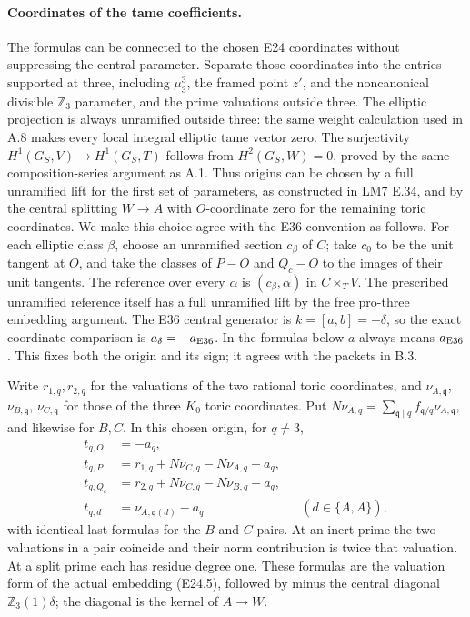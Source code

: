\paragraph{Coordinates of the tame coefficients.}
The formulas can be connected to the chosen E24 coordinates without
suppressing the central parameter. Separate those coordinates into
the entries supported at three, including $\mu_3^3$, the framed
point $z'$, and the noncanonical divisible $\mathbb Z_3$ parameter,
and the prime valuations outside three. The elliptic projection is
always unramified outside three: the same weight calculation used
in A.8 makes every local integral elliptic tame vector zero.
The surjectivity $H^1(G_S,V)\to H^1(G_S,T)$ follows from
$H^2(G_S,W)=0$, proved by the same composition-series argument as
A.1. Thus origins can be chosen by a full unramified lift for the
first set of parameters, as constructed in LM7 E.34, and by the
central splitting $W\to A$ with $O$-coordinate zero for the
remaining toric coordinates. We make this choice agree with the E36 convention as follows.
For each elliptic class $\beta$, choose an unramified section $c_\beta$
of $C$; take $c_0$ to be the unit tangent at $O$, and take the
classes of $P-O$ and $Q_c-O$ to the images of their unit tangents.
The reference over every $\alpha$ is $(c_\beta,\alpha)$ in
$C\times_TV$. The prescribed unramified reference itself has a
full unramified lift by the free pro-three embedding argument.
The E36 central generator is $k=[a,b]=-\delta$, so the exact
coordinate comparison is $a_\delta=-a_{\rm E36}$. In the formulas
below $a$ always means $a_{\rm E36}$. This fixes both the origin
and its sign; it agrees with the packets in B.3.

Write $r_{1,q},r_{2,q}$ for the valuations of the two rational
toric coordinates, and $\nu_{A,\mathfrak q}$,
$\nu_{B,\mathfrak q}$, $\nu_{C,\mathfrak q}$ for those of the
three $K_0$ toric coordinates. Put
$N\nu_{A,q}=\sum_{\mathfrak q\mid q}f_{\mathfrak q/q}
\nu_{A,\mathfrak q}$, and likewise for $B,C$. In this chosen
origin, for $q\ne3$,
\[
\begin{aligned}
 t_{q,O}&=-a_q,\\
 t_{q,P}&=r_{1,q}+N\nu_{C,q}-N\nu_{A,q}-a_q,\\
 t_{q,Q_c}&=r_{2,q}+N\nu_{C,q}-N\nu_{B,q}-a_q,\\
 t_{q,d}&=\nu_{A,\mathfrak q(d)}-a_q
                  &&(d\in\{A,\bar A\}),
\end{aligned}
\tag{A.8.5}
\]
with identical last formulas for the $B$ and $C$ pairs. At an inert
prime the two valuations in a pair coincide and their norm
contribution is twice that valuation. At a split prime each has
residue degree one. These formulas are the valuation form of the
actual embedding (E24.5), followed by minus the central diagonal
$\mathbb Z_3(1)\delta$; the diagonal is the kernel of $A\to W$.


